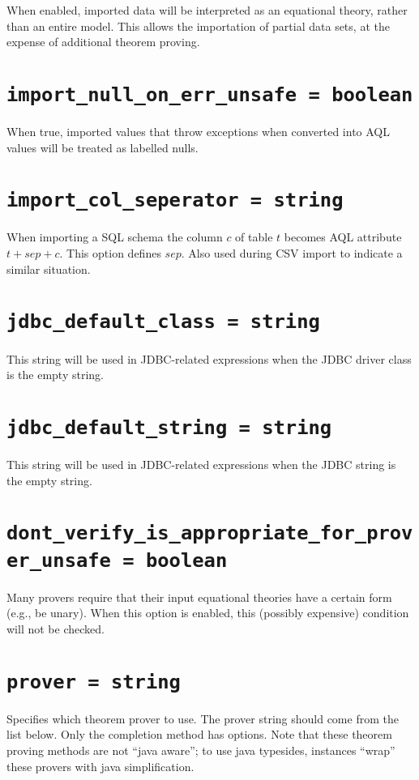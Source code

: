 \documentclass[10pt]{book}
\begin{document}
When enabled, imported data will be interpreted as an equational theory, rather than an entire model.  This allows the importation of partial data sets, at the expense of additional theorem proving.

\section{ {\tt import\_null\_on\_err\_unsafe = boolean} }

When true, imported values that throw exceptions when converted into AQL values will be treated as labelled nulls.
			
\section{ {\tt import\_col\_seperator = string} }

When importing a SQL schema the column $c$ of table $t$ becomes AQL attribute $t + sep + c$.  This option defines $sep$.  Also used during CSV import to indicate a similar situation.


\section{ {\tt jdbc\_default\_class = string } }

This string will be used in JDBC-related expressions when the JDBC driver class is the empty string.

\section{ {\tt jdbc\_default\_string = string } }

This string will be used in JDBC-related expressions when the JDBC string is the empty string.

\section{{\tt dont\_verify\_is\_appropriate\_for\_prover\_unsafe = boolean}}
Many provers require that their input equational theories have a certain form (e.g., be unary).  When this option is enabled, this (possibly expensive) condition will not be checked.
				
\section{{\tt prover = string}}
Specifies which theorem prover to use.  The prover string should come from the list below.  Only the completion method has options.  Note that these theorem proving methods are not ``java aware''; to use java typesides, instances ``wrap'' these provers with java simplification.
\end{document}
